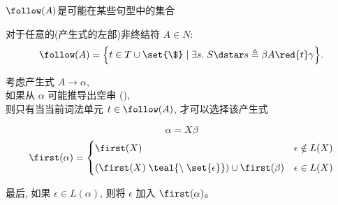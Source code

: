 \begin{frame}{}
  \begin{center}

    \vspace{0.60cm}
    $\follow(A)$是可能在某些句型中的集合
    \begin{definition}[$\follow(A)$集合]
        对于任意的(产生式的左部)非终结符 $A \in N:$
        \[
          \follow(A) = \Big\{t \in T \cup \set{\$}
            \mid \exists s.\; S \dstar s \triangleq \beta A\red{t} \gamma\Big\}.
        \]
    \end{definition}

    \pause
    \vspace{0.60cm}
    考虑产生式 $A \to \alpha$, \\[4pt]
    如果从 $\alpha$ 可能推导出空串 (\red{$\alpha \dstar \epsilon$}), \\[4pt]
    则只有当当前词法单元 $t \in \follow(A)$, 才可以选择该产生式
  \end{center}
\end{frame}

\begin{frame}{}
  \begin{center}

    

  \end{center}
\end{frame}

\begin{frame}{}
  \begin{center}

    \[
      \alpha = X \beta
    \]
    \[
      \first(\alpha) =
      \begin{cases}
        \first(X) & \epsilon \notin L(X) \\[6pt]
        (\first(X) \;\teal{\setminus\; \set{\epsilon}}) \cup \first(\beta) & \epsilon \in L(X)
      \end{cases}
    \]

    \vspace{0.60cm}
    最后, 如果 $\epsilon \in L(\alpha)$, 则将 $\epsilon$ 加入 $\first(\alpha)$。
  \end{center}
\end{frame}

